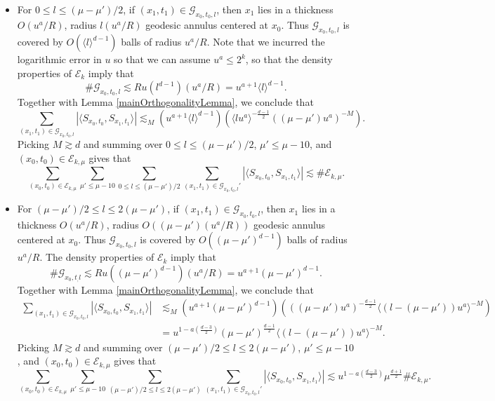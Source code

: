 \begin{itemize}
    \item For $0 \leq l \leq (\mu - \mu') / 2$, if $(x_1,t_1) \in \mathcal{G}_{x_0,t_0,l}$, then $x_1$ lies in a thickness $O(u^a / R)$, radius $l (u^a / R)$ geodesic annulus centered at $x_0$. Thus $\mathcal{G}_{x_0,t_0,l}$ is covered by $O( \langle l \rangle ^{d-1})$ balls of radius $u^a / R$. Note that we incurred the logarithmic error in $u$ so that we can assume $u^a \leq 2^k$, so that the density properties of $\mathcal{E}_k$ imply that
    \[ \# \mathcal{G}_{x_0,t_0,l} \lesssim Ru (l^{d-1}) (u^a / R) = u^{a+1} \langle l \rangle^{d-1}. \]
    Together with Lemma \ref{mainOrthogonalityLemma}, we conclude that
    \[ \sum_{(x_1,t_1) \in \mathcal{G}_{x_0,t_0,l}} |\langle {S\!}_{x_0,t_0}, {S\!}_{x_1,t_1} \rangle| \lesssim_M ( u^{a+1} \langle l \rangle^{d-1} ) \left( \langle l u^a \rangle^{- \frac{d-1}{2}} \left( (\mu - \mu') u^a \right)^{-M} \right). \]
    Picking $M \gtrsim d$ and summing over $0 \leq l \leq (\mu - \mu') / 2$, $\mu' \leq \mu - 10$, and $(x_0,t_0) \in \mathcal{E}_{k,\mu}$ gives that
    \[ \sum_{(x_0,t_0) \in \mathcal{E}_{k,\mu}} \sum_{\mu' \leq \mu - 10} \sum_{0 \leq l \leq (\mu - \mu') / 2} \sum_{(x_1,t_1) \in \mathcal{G}_{x_0,t_0,l}'} |\langle {S\!}_{x_0,t_0}, {S\!}_{x_1,t_1} \rangle| \lesssim \# \mathcal{E}_{k,\mu}. \]

    \item For $(\mu - \mu') / 2 \leq l \leq 2 (\mu - \mu')$, if $(x_1,t_1) \in \mathcal{G}_{x_0,t_0,l}$, then $x_1$ lies in a thickness $O(u^a / R)$, radius $O((\mu - \mu') (u^a / R))$ geodesic annulus centered at $x_0$. Thus $\mathcal{G}_{x_0,t_0,l}$ is covered by $O( (\mu - \mu')^{d-1} )$ balls of radius $u^a / R$. The density properties of $\mathcal{E}_k$ imply that
    \[ \# \mathcal{G}_{x_0,t_,l} \lesssim Ru ( (\mu - \mu')^{d-1} ) (u^a/R) = u^{a+1} (\mu - \mu')^{d-1}. \]
    Together with Lemma \ref{mainOrthogonalityLemma}, we conclude that
    \begin{align*}
        \sum_{(x_1,t_1) \in \mathcal{G}_{x_0,t_0,l}} |\langle {S\!}_{x_0,t_0}, {S\!}_{x_1,t_1} \rangle| &\lesssim_M (u^{a+1} (\mu - \mu')^{d-1}) \left( ((\mu - \mu') u^a )^{- \frac{d-1}{2}} \langle (l - (\mu - \mu')) u^a \rangle^{-M} \right)\\
        &= u^{1 - a \left( \frac{d-3}{2} \right)} (\mu - \mu')^{\frac{d-1}{2}} \langle (l - (\mu - \mu')) u^a \rangle^{-M}.
    \end{align*}
    Picking $M \gtrsim d$ and summing over $(\mu - \mu') / 2 \leq l \leq 2 (\mu - \mu')$, $\mu' \leq \mu - 10$, and $(x_0,t_0) \in \mathcal{E}_{k,\mu}$ gives that
    \[ \sum_{(x_0,t_0) \in \mathcal{E}_{k,\mu}} \sum_{\mu' \leq \mu - 10} \sum_{(\mu - \mu')/2 \leq l \leq 2(\mu - \mu')} \sum_{(x_1,t_1) \in \mathcal{G}_{x_0,t_0,l}'} |\langle {S\!}_{x_0,t_0}, {S\!}_{x_1,t_1} \rangle| \lesssim u^{1 - a \left( \frac{d-3}{2} \right)} \mu^{\frac{d+1}{2}} \# \mathcal{E}_{k,\mu}. \]


\end{itemize}

